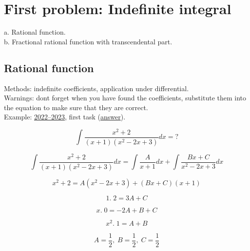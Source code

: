 \documentclass{article}
\begin{document}
\section{First problem: Indefinite integral}
a. Rational function. \\
b. Fractional rational function with transcendental part.

\subsection{Rational function}

Methods: indefinite coefficients, application under differential. \\
Warnings: dont forget when you have found the coefficients, substitute them into the equation to make sure that they are correct. \\
Example: \href{https://old.mipt.ru/education/chair/mathematics/exams/exams/2022-23/%D0%9C%D0%90%D0%98%D0%B8%D0%A0_%D0%92_23.pdf}{2022–2023}, first task (\href{https://old.mipt.ru/education/chair/mathematics/exams/exams/2022-23/%D0%9C%D0%90%D0%98%D0%B8%D0%A0_%D0%92_23%D0%BE%D1%82%D0%B2%D0%B5%D1%82%D1%8B.pdf}{answer}).

\begin{equation}
    \int \frac{x^2+2}{(x+1)(x^2-2x+3)}dx = ?
\end{equation}

\begin{equation*}
    \int \frac{x^2+2}{(x+1)(x^2-2x+3)}dx = \int \frac{A}{x+1}dx + \int \frac{Bx+C}{x^2-2x+3}dx
\end{equation*}

\begin{equation}
    x^2+2 = A(x^2-2x+3) + (Bx+C)(x+1)
\end{equation}

\begin{equation*}
    1. \; 2 = 3A + C
\end{equation*}

\begin{equation*}
    x. \; 0 = -2A + B + C
\end{equation*}

\begin{equation*}
    x^2. \; 1 = A + B
\end{equation*}

\begin{equation}
    A = \frac{1}{2}, \; B = \frac{1}{2}, \; C = \frac{1}{2}
\end{equation}
\end{document}
